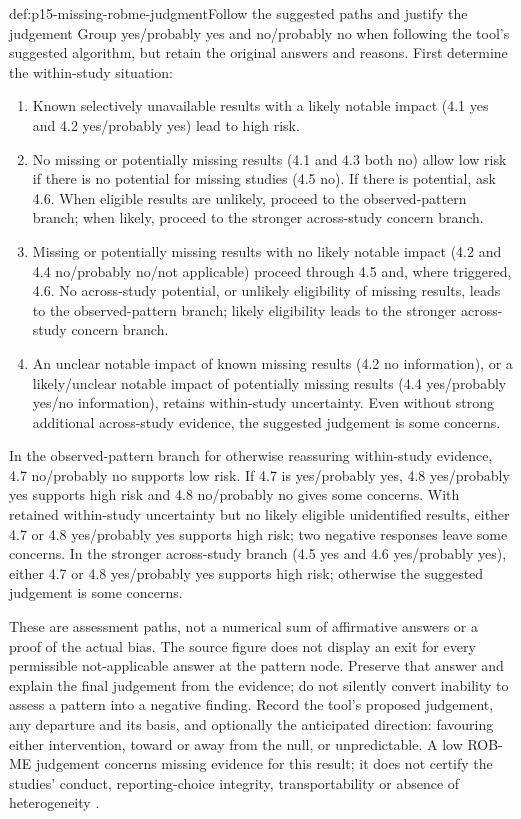 \begin{hbmethod}{def:p15-missing-robme-judgment}{Follow the suggested paths and justify the judgement}
Group yes/probably yes and no/probably no when following the tool's
suggested algorithm, but retain the original answers and reasons.
First determine the within-study situation:
\begin{enumerate}
\item Known selectively unavailable results with a likely notable
      impact (4.1 yes and 4.2 yes/probably yes) lead to high risk.
\item No missing or potentially missing results (4.1 and 4.3 both no)
      allow low risk if there is no potential for missing studies
      (4.5 no). If there is potential, ask 4.6. When eligible results
      are unlikely, proceed to the observed-pattern branch; when
      likely, proceed to the stronger across-study concern branch.
\item Missing or potentially missing results with no likely notable
      impact (4.2 and 4.4 no/probably no/not applicable) proceed
      through 4.5 and, where triggered, 4.6. No across-study potential,
      or unlikely eligibility of missing results, leads to the
      observed-pattern branch; likely eligibility leads to the
      stronger across-study concern branch.
\item An unclear notable impact of known missing results (4.2 no
      information), or a likely/unclear notable impact of potentially
      missing results (4.4 yes/probably yes/no information), retains
      within-study uncertainty. Even without strong additional
      across-study evidence, the suggested judgement is some concerns.
\end{enumerate}
In the observed-pattern branch for otherwise reassuring within-study
evidence, 4.7 no/probably no supports low risk. If 4.7 is
yes/probably yes, 4.8 yes/probably yes supports high risk and
4.8 no/probably no gives some concerns.
With retained within-study uncertainty but no likely eligible
unidentified results, either 4.7 or 4.8 yes/probably yes supports
high risk; two negative responses leave some concerns.
In the stronger across-study branch (4.5 yes and 4.6 yes/probably yes),
either 4.7 or 4.8 yes/probably yes supports high risk; otherwise
the suggested judgement is some concerns.

These are assessment paths, not a numerical sum of affirmative answers
or a proof of the actual bias. The source figure does not display an
exit for every permissible not-applicable answer at the pattern node.
Preserve that answer and explain the final judgement from the evidence;
do not silently convert inability to assess a pattern into a negative
finding. Record the tool's proposed judgement, any departure and its
basis, and optionally the anticipated direction: favouring either
intervention, toward or away from the null, or unpredictable.
A low ROB-ME judgement concerns missing evidence for this result; it
does not certify the studies' conduct, reporting-choice integrity,
transportability or absence of heterogeneity
\cite[fig.~2, table~1, pp.~13--15]{ROBME2023Cribsheet}
\cite[sec.~13.3.5]{PageHigginsSterne2024Cochrane13}.
\end{hbmethod}

